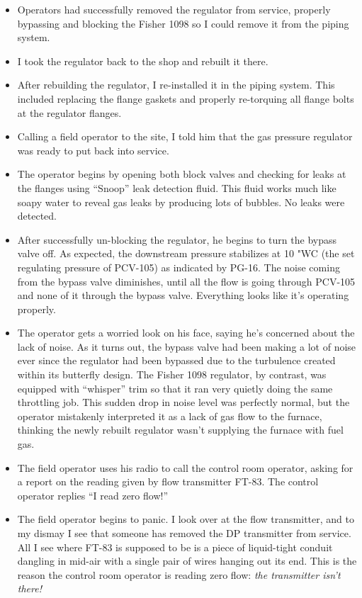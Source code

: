 \begin{itemize}
\item{} Operators had successfully removed the regulator from service, properly bypassing and blocking the Fisher 1098 so I could remove it from the piping system.
\vskip 10pt
\item{} I took the regulator back to the shop and rebuilt it there.
\vskip 10pt
\item{} After rebuilding the regulator, I re-installed it in the piping system.  This included replacing the flange gaskets and properly re-torquing all flange bolts at the regulator flanges.
\vskip 10pt
\item{} Calling a field operator to the site, I told him that the gas pressure regulator was ready to put back into service.
\vskip 10pt
\item{} The operator begins by opening both block valves and checking for leaks at the flanges using ``Snoop'' leak detection fluid.  This fluid works much like soapy water to reveal gas leaks by producing lots of bubbles.  No leaks were detected.
\vskip 10pt
\item{} After successfully un-blocking the regulator, he begins to turn the bypass valve off.  As expected, the downstream pressure stabilizes at 10 "WC (the set regulating pressure of PCV-105) as indicated by PG-16.  The noise coming from the bypass valve diminishes, until all the flow is going through PCV-105 and none of it through the bypass valve.  Everything looks like it's operating properly.
\vskip 10pt
\item{} The operator gets a worried look on his face, saying he's concerned about the lack of noise.  As it turns out, the bypass valve had been making a lot of noise ever since the regulator had been bypassed due to the turbulence created within its butterfly design.  The Fisher 1098 regulator, by contrast, was equipped with ``whisper'' trim so that it ran very quietly doing the same throttling job.  This sudden drop in noise level was perfectly normal, but the operator mistakenly interpreted it as a lack of gas flow to the furnace, thinking the newly rebuilt regulator wasn't supplying the furnace with fuel gas.
\vskip 10pt
\item{} The field operator uses his radio to call the control room operator, asking for a report on the reading given by flow transmitter FT-83.  The control operator replies ``I read zero flow!''
\vskip 10pt
\item{} The field operator begins to panic.  I look over at the flow transmitter, and to my dismay I see that someone has removed the DP transmitter from service.  All I see where FT-83 is supposed to be is a piece of liquid-tight conduit dangling in mid-air with a single pair of wires hanging out its end.  This is the reason the control room operator is reading zero flow: {\it the transmitter isn't there!}

\end{itemize}
